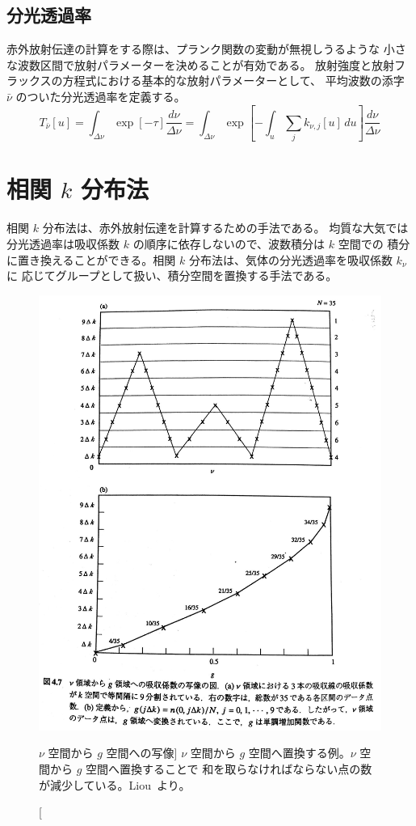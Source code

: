 \documentclass[article,twoside]{dennou777}
\begin{document}
\subsection{分光透過率}
赤外放射伝達の計算をする際は、プランク関数の変動が無視しうるような
小さな波数区間で放射パラメーターを決めることが有効である。
放射強度と放射フラックスの方程式における基本的な放射パラメーターとして、
平均波数の添字 $\bar\nu$ のついた分光透過率を定義する。
\begin{equation}
	T_{\bar\nu}[u]
	=\int_{\Delta\nu}\exp[-\tau]\frac{d\nu}{\Delta\nu}
	=\int_{\Delta\nu}\exp\left[-\int_u\sum_j k_{\nu,j}[u]\,du\right]\frac{d\nu}{\Delta\nu}
\end{equation}

\section{相関 $k$ 分布法}
相関 $k$ 分布法は、赤外放射伝達を計算するための手法である。
均質な大気では分光透過率は吸収係数 $k$ の順序に依存しないので、波数積分は $k$ 空間での
積分に置き換えることができる。相関 $k$ 分布法は、気体の分光透過率を吸収係数 $k_\nu$ に
応じてグループとして扱い、積分空間を置換する手法である。

\begin{figure}[t]
	\includegraphics[width=\textwidth]{kbunpu.jpg}
	\caption
		[$\nu$ 空間から $g$ 空間への写像]
		{
			$\nu$ 空間から $g$ 空間へ置換する例。$\nu$ 空間から $g$ 空間へ置換することで
			和を取らなければならない点の数が減少している。Liou~\cite{liou}より。
		}
\end{figure}
\end{document}
